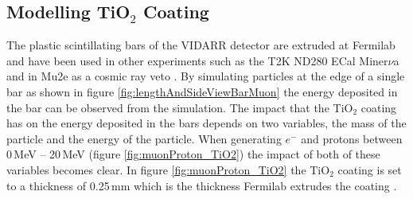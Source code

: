 \begin{figure}[!h]
\begin{minipage}{.45\textwidth}
  \label{fig:individualDarkNoiseOld}
\end{minipage}
\end{figure}

\subsection{Modelling TiO$_2$ Coating}
The plastic scintillating bars of the VIDARR detector are extruded at Fermilab and have been used in other experiments such as the T2K ND280 ECal \cite{Allan_2013} Miner$\nu$a \cite{aliaga2014design} and in Mu2e as a cosmic ray veto \cite{Pla-Dalmau2014}. By simulating particles at the edge of a single bar as shown in figure \ref{fig:lengthAndSideViewBarMuon} the energy deposited in the bar can be observed from the simulation. The impact that the TiO$_2$ coating has on the energy deposited in the bars depends on two variables, the mass of the particle and the energy of the particle. When generating $e^-$ and protons between 0\,MeV -- 20\,MeV (figure \ref{fig:muonProton_TiO2}) the impact of both of these variables becomes clear. In figure \ref{fig:muonProton_TiO2} the TiO$_2$ coating is set to a thickness of 0.25\,mm which is the thickness Fermilab extrudes the coating \cite{Pla-Dalmau2014}.

